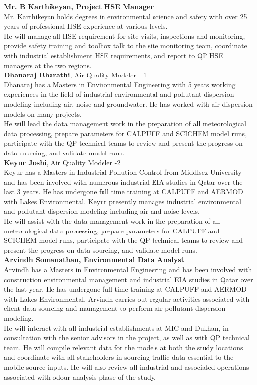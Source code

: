 \textbf{Mr. B Karthikeyan, Project HSE Manager}\\
Mr. Karthikeyan holds degrees in environmental science and safety with over 25 years of professional HSE experience at various levels.\\
He will manage all HSE requirement for site visits, inspections and monitoring, provide safety training and toolbox talk to the site monitoring team, coordinate with industrial establishment HSE requirements, and report to QP HSE managers at the two regions.\\

\textbf{Dhanaraj Bharathi}, Air Quality Modeler - 1\\
Dhanaraj has a Masters in Environmental Engineering with 5 years working experiences in the field of industrial environmental and pollutant dispersion modeling including air, noise and groundwater. He has worked with air dispersion models on many projects.\\
He will lead the data management work in the preparation of all meteorological data processing, prepare parameters for CALPUFF and SCICHEM model runs, participate with the QP technical teams to review and present the progress on data sourcing,  and validate model runs.\\

\textbf{Keyur Joshi},  Air Quality Modeler -2\\

Keyur has a Masters in Industrial Pollution Control from Middlsex University and has been involved with numerous industrial EIA studies in Qatar over the last 3 years. He has undergone full time training at CALPUFF and AERMOD with Lakes Environmental. Keyur presently manages industrial environmental and pollutant dispersion modeling including air and noise levels.\\
He will assist with the data management work in the preparation of all meteorological data processing, prepare parameters for CALPUFF and SCICHEM model runs, participate with the QP technical teams to review and present the progress on data sourcing,  and validate model runs.\\

\textbf{Arvindh Somanathan, Environmental Data Analyst}\\
Arvindh has a Masters in Environmental Engineering and  has been involved with construction environmental management and  industrial EIA studies in Qatar over the last year. He has undergone full time training at CALPUFF and AERMOD with Lakes Environmental.
Arvindh carries out regular activities associated with client data sourcing and management to perform air pollutant dispersion modeling. \\
He will interact with all industrial establishments at MIC and Dukhan, in consultation with the senior advisors in the project, as well as with QP technical team. He will compile relevant data for the models at both the study locations and coordinate with all stakeholders in sourcing traffic data essential to the mobile source inputs. He will also review all industrial and associated operations associated with odour analysis phase of the study.\\

